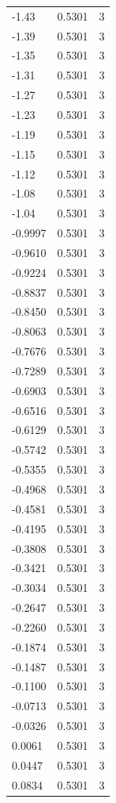 \begin{longtable}{lrr}
  -1.43 & 0.5301 & 3 \\
  -1.39 & 0.5301 & 3 \\
  -1.35 & 0.5301 & 3 \\
  -1.31 & 0.5301 & 3 \\
  -1.27 & 0.5301 & 3 \\
  -1.23 & 0.5301 & 3 \\
  -1.19 & 0.5301 & 3 \\
  -1.15 & 0.5301 & 3 \\
  -1.12 & 0.5301 & 3 \\
  -1.08 & 0.5301 & 3 \\
  -1.04 & 0.5301 & 3 \\
  -0.9997 & 0.5301 & 3 \\
  -0.9610 & 0.5301 & 3 \\
  -0.9224 & 0.5301 & 3 \\
  -0.8837 & 0.5301 & 3 \\
  -0.8450 & 0.5301 & 3 \\
  -0.8063 & 0.5301 & 3 \\
  -0.7676 & 0.5301 & 3 \\
  -0.7289 & 0.5301 & 3 \\
  -0.6903 & 0.5301 & 3 \\
  -0.6516 & 0.5301 & 3 \\
  -0.6129 & 0.5301 & 3 \\
  -0.5742 & 0.5301 & 3 \\
  -0.5355 & 0.5301 & 3 \\
  -0.4968 & 0.5301 & 3 \\
  -0.4581 & 0.5301 & 3 \\
  -0.4195 & 0.5301 & 3 \\
  -0.3808 & 0.5301 & 3 \\
  -0.3421 & 0.5301 & 3 \\
  -0.3034 & 0.5301 & 3 \\
  -0.2647 & 0.5301 & 3 \\
  -0.2260 & 0.5301 & 3 \\
  -0.1874 & 0.5301 & 3 \\
  -0.1487 & 0.5301 & 3 \\
  -0.1100 & 0.5301 & 3 \\
  -0.0713 & 0.5301 & 3 \\
  -0.0326 & 0.5301 & 3 \\
  0.0061 & 0.5301 & 3 \\
  0.0447 & 0.5301 & 3 \\
  0.0834 & 0.5301 & 3 \\

\end{longtable}
